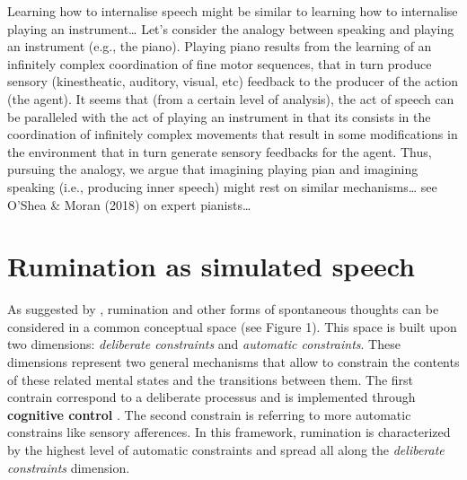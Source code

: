 \documentclass[12pt,]{book}
\begin{document}
Learning how to internalise speech might be similar to learning how to
internalise playing an instrument\ldots{} Let's consider the analogy
between speaking and playing an instrument (e.g., the piano). Playing
piano results from the learning of an infinitely complex coordination of
fine motor sequences, that in turn produce sensory (kinestheatic,
auditory, visual, etc) feedback to the producer of the action (the
agent). It seems that (from a certain level of analysis), the act of
speech can be paralleled with the act of playing an instrument in that
its consists in the coordination of infinitely complex movements that
result in some modifications in the environment that in turn generate
sensory feedbacks for the agent. Thus, pursuing the analogy, we argue
that imagining playing pian and imagining speaking (i.e., producing
inner speech) might rest on similar mechanisms\ldots{} see O'Shea \&
Moran (2018) on expert pianists\ldots{}

\chapter{Rumination as simulated
speech}\label{rumination-as-simulated-speech}

As suggested by \citet{Christoff2016}, rumination and other forms of
spontaneous thoughts can be considered in a common conceptual space (see
Figure 1). This space is built upon two dimensions: \emph{deliberate
constraints} and \emph{automatic constraints}. These dimensions
represent two general mechanisms that allow to constrain the contents of
these related mental states and the transitions between them. The first
contrain correspond to a deliberate processus and is implemented through
\textbf{cognitive control} \citep{Miller2000}. The second constrain is
referring to more automatic constrains like sensory afferences. In this
framework, rumination is characterized by the highest level of automatic
constraints and spread all along the \emph{deliberate constraints}
dimension.
\end{document}
